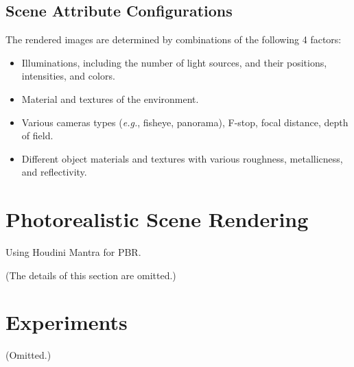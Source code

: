 \documentclass[10pt]{article}
\newcommand{\Eg}{\textit{e.g.}}
\begin{document}
\subsection{Scene Attribute Configurations}%
\label{sec:configuration}
The rendered images are determined by combinations of the following 4 factors:
%
\begin{itemize}
  \item Illuminations, including the number of light sources, and their
    positions, intensities, and colors.
  \item Material and textures of the environment.
  \item Various cameras types (\Eg, fisheye, panorama), F-stop, focal distance,
    depth of field.
  \item Different object materials and textures with various roughness,
    metallicness, and reflectivity.
\end{itemize}


\section{Photorealistic Scene Rendering}%
\label{sec:rendering}
Using Houdini Mantra for PBR\@.

(The details of this section are omitted.)


\section{Experiments}%
\label{sec:experiments}
(Omitted.)


\end{document}
